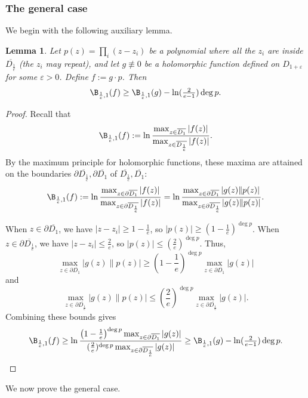 \documentclass[reqno]{amsart}
\theoremstyle{plain}
\newtheorem{Lem}[Cor]{Lemma}
\theoremstyle{definition}
\theoremstyle{remark}
\theoremstyle{plain}
\begin{document}
\subsubsection{The general case}

We begin with the following auxiliary lemma.

\begin{Lem}\label{Lemma Bernstein index of product with polynomial}
Let $p(z)=\prod_i(z-z_i)$ be a polynomial where all the ${z_i}$ are inside $\overline{D_\frac1e}$ (the $z_i$ may repeat), and let $g\not\equiv 0$ be a holomorphic function defined on $D_{1+\varepsilon}$ for some $\varepsilon>0$.
Define $f:=g\cdot p$. Then
\[
    \B_{\frac1e,1}(f)\geq\B_{\frac1e,1}(g)-\ln(\tfrac{2}{e-1})\deg p
.\]
\end{Lem}

\begin{proof}
Recall that
\[
    \B_{\frac1e,1}(f):=\ln\frac{\max_{z\in\overline{D_1}}|f(z)|}{\max_{z\in\overline{D_\frac1e}}|f(z)|}
.\]
By the maximum principle for holomorphic functions, these maxima are attained on the boundaries $\partial\overline{D_\frac1e},\partial\overline{D_1}$ of $\overline{D_\frac1e},\overline{D_1}$:
\[
    \B_{\frac1e,1}(f):=\ln\frac{\max_{z\in \partial\overline{D_1}}|f(z)|}{\max_{z\in \partial\overline{D_\frac1e}}|f(z)|}=\ln\frac{\max_{z\in \partial\overline{D_1}}|g(z)\|p(z)|}{\max_{z\in \partial\overline{D_\frac1e}}|g(z)\|p(z)|}
.\]

When $z\in \partial\overline{D_1}$, we have $|z-z_i|\geq1-\frac1e$, so $|p(z)|\geq\left(1-\frac1e\right)^{\deg p}$. When $z\in \partial\overline{D_\frac1e}$, we have $|z-z_i|\leq\frac2e$, so $|p(z)|\leq(\frac2e)^{\operatorname{deg}p}$.
Thus,
\[
    \max_{z\in \partial\overline{D_1}}|g(z)\|p(z)|\geq\left(1-\frac1e\right)^{\deg p}\max_{z\in \partial\overline{D_1}}|g(z)|
\]
and
\[
    \max_{z\in \partial\overline{D_\frac1e}}|g(z)\|p(z)|\leq\left(\frac2e\right)^{\operatorname{deg}p}\max_{z\in \partial\overline{D_\frac1e}}|g(z)|
.\]
\enlargethispage{\baselineskip}
Combining these bounds gives
\[
    \B_{\frac1e,1}(f)\geq\ln\frac{\left(1-\frac1e\right)^{\deg p}\max_{z\in \partial\overline{D_1}}|g(z)|}{(\frac2e)^{\operatorname{deg}p}\max_{z\in \partial\overline{D_\frac1e}}|g(z)|}\geq\B_{\frac1e,1}(g)-\ln(\tfrac{2}{e-1})\deg p
.\]
\end{proof}

We now prove the general case.
\end{document}
